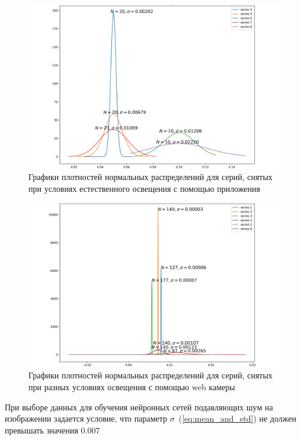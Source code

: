 \documentclass[14pt]{mmcs_article}
\begin{document}
\begin{figure}[H]
	\centering
	\includegraphics[scale=0.065]{img/good_condition_series_real_noise_iphone_deviation_comparison}
	\caption{Графики плотностей нормальных распределений для серий, снятых при условиях естественного освещения с помощью приложения~\autocite{RAWCamera}}
	\label{fig:distribuion_real_noise_good_condition}
\end{figure}

\begin{figure}[H]
	\centering
	\includegraphics[scale=0.065]{img/series_webcam_deviation_comparison}
	\caption{Графики плотностей нормальных распределений для серий, снятых при разных условиях освещения с помощью web камеры~\autocite{WebCam}}
	\label{fig:distribuion_webcam}
\end{figure}


При выборе данных для обучения нейронных сетей подавляющих шум на изображении задается условие, что параметр $\sigma$~(\ref{eq:mean_and_std}) не должен превышать значения $0.007$
\end{document}

